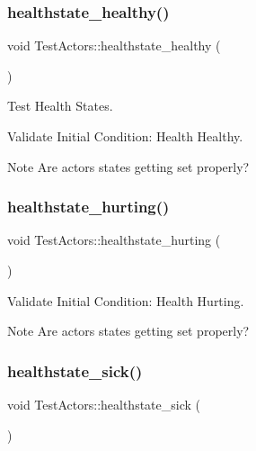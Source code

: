 \subsubsection{\texorpdfstring{healthstate\+\_\+healthy()}{healthstate\_healthy()}}
{\footnotesize\ttfamily void Test\+Actors\+::healthstate\+\_\+healthy (\begin{DoxyParamCaption}{ }\end{DoxyParamCaption})}



Test Health States. 

Validate Initial Condition\+: Health Healthy.

\begin{DoxyNote}{Note}
Are actors states getting set properly? 
\end{DoxyNote}
\mbox{\label{classTestActors_ad75102f6eb0169c9decf8d0d77b3177c}} 
\subsubsection{\texorpdfstring{healthstate\+\_\+hurting()}{healthstate\_hurting()}}
{\footnotesize\ttfamily void Test\+Actors\+::healthstate\+\_\+hurting (\begin{DoxyParamCaption}{ }\end{DoxyParamCaption})}



Validate Initial Condition\+: Health Hurting. 

\begin{DoxyNote}{Note}
Are actors states getting set properly? 
\end{DoxyNote}
\mbox{\label{classTestActors_a53e83cec390b5f6052138134caa62c36}} 
\subsubsection{\texorpdfstring{healthstate\+\_\+sick()}{healthstate\_sick()}}
{\footnotesize\ttfamily void Test\+Actors\+::healthstate\+\_\+sick (\begin{DoxyParamCaption}{ }\end{DoxyParamCaption})}



